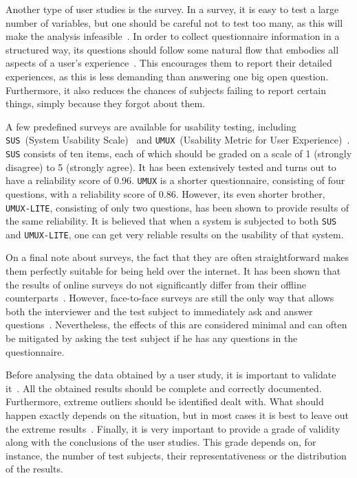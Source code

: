 Another type of user studies is the survey. In a survey, it is easy to test a large number of variables, but one should be careful not to test too many, as this will make the analysis infeasible~\cite{wohlin2003empirical}. In order to collect questionnaire information in a structured way, its questions should follow some natural flow that embodies all aspects of a user's experience~\cite{tuch2013analyzing}. This encourages them to report their detailed experiences, as this is less demanding than answering one big open question. Furthermore, it also reduces the chances of subjects failing to report certain things, simply because they forgot about them.

A few predefined surveys are available for usability testing, including \verb|SUS|~(System Usability Scale)~\cite{brooke2013sus} and \verb|UMUX|~(Usability Metric for User Experience)~\cite{lewis2013umux}. \verb|SUS| consists of ten items, each of which should be graded on a scale of 1 (strongly disagree) to 5 (strongly agree). It has been extensively tested and turns out to have a reliability score of 0.96. \verb|UMUX| is a shorter questionnaire, consisting of four questions, with a reliability score of 0.86. However, its even shorter brother, \verb|UMUX-LITE|, consisting of only two questions, has been shown to provide results of the same reliability. It is believed that when a system is subjected to both \verb|SUS| and \verb|UMUX-LITE|, one can get very reliable results on the usability of that system.

On a final note about surveys, the fact that they are often straightforward makes them perfectly suitable for being held over the internet. It has been shown that the results of online surveys do not significantly differ from their offline counterparts~\cite{komarov2013crowdsourcing}. However, face-to-face surveys are still the only way that allows both the interviewer and the test subject to immediately ask and answer questions~\cite{wohlin2003empirical}. Nevertheless, the effects of this are considered minimal and can often be mitigated by asking the test subject if he has any questions in the questionnaire.

Before analysing the data obtained by a user study, it is important to validate it~\cite{wohlin2003empirical}. All the obtained results should be complete and correctly documented. Furthermore, extreme outliers should be identified dealt with. What should happen exactly depends on the situation, but in most cases it is best to leave out the extreme results~\cite{komarov2013crowdsourcing}. Finally, it is very important to provide a grade of validity along with the conclusions of the user studies. This grade depends on, for instance, the number of test subjects, their representativeness or the distribution of the results.
